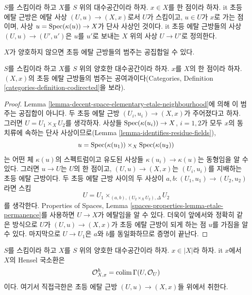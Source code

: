 \begin{definition}
\label{definition-elemenary-etale-neighbourhood}
$S$를 스킴이라 하고 $X$를 $S$ 위의 대수공간이라 하자.
$x \in X$를 한 점이라 하자.
{it 초등 에탈 근방}은 에탈 사상 $(U, u) \to (X, x)$로서 $U$가
스킴이고, $u \in U$가 $x$로 가는 점이며, 사상
$u = \mathop{\mathrm{Spec}}(\kappa(u)) \to X$가 단사 사상인 것이다.
{it 초등 에탈 근방들의 사상} $(U, u) \to (U', u')$은 $u$를 $u'$로
보내는 $X$ 위의 사상 $U \to U'$로 정의한다.
\end{definition}

\noindent
$X$가 양호하지 않으면 초등 에탈 근방들의 범주는 공집합일 수 있다.

\begin{lemma}
\label{lemma-elementary-etale-neighbourhoods}
$S$를 스킴이라 하고 $X$를 $S$ 위의 양호한 대수공간이라 하자.
$x$를 $X$의 한 점이라 하자. $(X, x)$의 초등 에탈 근방들의 범주는
공여과이다(Categories, Definition
\ref{categories-definition-codirected}을 보라).
\end{lemma}

\begin{proof}
Lemma \ref{lemma-decent-space-elementary-etale-neighbourhood}에 의해 이
범주는 공집합이 아니다. 두 초등 에탈 근방
$(U_i, u_i) \to (X, x)$가 주어졌다고 하자. 그러면
$U = U_1 \times_X U_2$를 생각하자. 사상들
$\mathop{\mathrm{Spec}}(\kappa(u_i)) \to X$, $i = 1, 2$가 모두 $x$의 동치류에 속하는
단사 사상이므로(Lemma \ref{lemma-identifies-residue-fields}),
$$
u = \mathop{\mathrm{Spec}}(\kappa(u_1)) \times_X \mathop{\mathrm{Spec}}(\kappa(u_2))
$$
는 어떤 체 $\kappa(u)$의 스펙트럼이고 유도된 사상들
$\kappa(u_i) \to \kappa(u)$는 동형임을 알 수 있다. 그러면
$u \to U$는 $U$의 한 점이고, $(U, u) \to (X, x)$는
$(U_i, u_i)$를 지배하는 초등 에탈 근방이다.
두 초등 에탈 근방 사이의 두 사상이
$a, b : (U_1, u_1) \to (U_2, u_2)$라면 스킴
$$
U = U_1 \times_{(a, b), (U_2 \times_X U_2), \Delta} U_2
$$
를 생각한다. Properties of Spaces, Lemma
\ref{spaces-properties-lemma-etale-permanence}를 사용하면 $U \to X$가
에탈임을 알 수 있다. 더욱이 앞에서와 정확히 같은 방식으로 $U$가
$(U, u) \to (X, x)$가 초등 에탈 근방이 되게 하는 점 $u$를 가짐을
알 수 있다. 마지막으로 $U \to U_1$은 $a$와 $b$를 동일화하므로
증명이 끝난다.
\end{proof}

\begin{definition}
\label{definition-henselian-local-ring}
$S$를 스킴이라 하고 $X$를 $S$ 위의 양호한 대수공간이라 하자.
$x \in |X|$라 하자. {it $x$에서 $X$의 Hensel 국소환}은
$$
\mathcal{O}_{X, x}^h = \mathop{\mathrm{colim}}\nolimits \Gamma(U, \mathcal{O}_U)
$$
이다. 여기서 직접극한은 초등 에탈 근방
$(U, u) \to (X, x)$들 위에서 취한다.
\end{definition}


